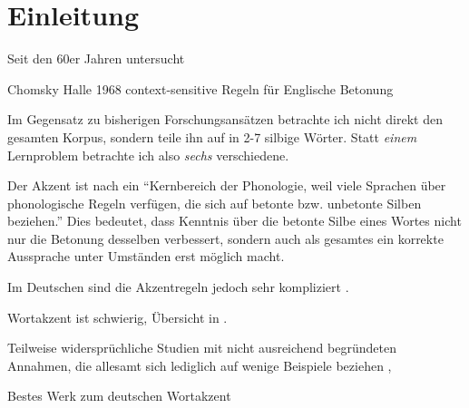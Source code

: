 \chapter{Einleitung}\label{Einleitung}




Seit den 60er Jahren untersucht \cite[S.~63]{Demberg2006}

Chomsky Halle 1968 context-sensitive Regeln für Englische Betonung

Im Gegensatz zu bisherigen Forschungsansätzen betrachte ich nicht direkt den gesamten Korpus, sondern teile ihn auf in 2-7 silbige Wörter. Statt \textit{einem} Lernproblem betrachte ich also \textit{sechs} verschiedene.

Der Akzent ist nach \cite[S.~278]{Hall2011} ein \enquote{Kernbereich der Phonologie, weil viele Sprachen über phonologische Regeln verfügen, die sich auf betonte bzw. unbetonte Silben beziehen.} Dies bedeutet, dass Kenntnis über die betonte Silbe eines Wortes nicht nur die Betonung desselben verbessert, sondern auch als gesamtes ein korrekte Aussprache unter Umständen erst möglich macht.

Im Deutschen sind die Akzentregeln jedoch sehr kompliziert \cite[S.~280]{Hall2011}.

Wortakzent ist schwierig, Übersicht in \cite{Jessen1999}.

Teilweise widersprüchliche Studien mit nicht ausreichend begründeten Annahmen, die allesamt sich lediglich auf wenige Beispiele beziehen \cite[S.~101f]{Fery1998}, \cite{Kaltenbacher1994}

Bestes Werk zum deutschen Wortakzent \cite{Mengel1998}


